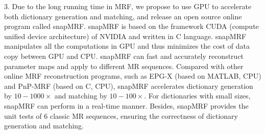 \begin{englishabstract}
3. Due to the long running time in MRF, we propose to use GPU to accelerate both dictionary generation and matching, and release an open source online program called snapMRF. snapMRF is based on the framework CUDA (compute unified device architecture) of NVIDIA and written in C language. snapMRF manipulates all the computations in GPU and thus minimizes the cost of data copy between GPU and CPU. snapMRF can fast and accurately reconstruct parameter maps and apply to different MR sequences. Compared with other online MRF reconstruction programs, such as EPG-X (based on MATLAB, CPU) and PnP-MRF (based on C, CPU), snapMRF accelerates dictionary generation by $10-1000\times$ and matching by $10-100\times$. For dictionaries with small sizes, snapMRF can perform in a real-time manner. Besides, snapMRF provides the unit tests of 6 classic MR sequences, ensuring the correctness of dictionary generation and matching. 


\end{englishabstract}